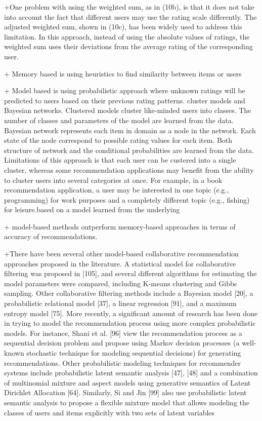 +One problem with using the weighted
sum, as in (10b), is that it does not take into account the fact
that different users may use the rating scale differently. The
adjusted weighted sum, shown in (10c), has been widely
used to address this limitation. In this approach, instead of
using the absolute values of ratings, the weighted sum uses
their deviations from the average rating of the corresponding
user.

+ Memory based is using heuristics to find similarity between items or users

+ Model based is using probabilistic approach where unknown ratings will be predicted to users based on their previous rating patterns. cluster models and Bayesian networks. 
Clustered models cluster like-minded users into classes. The number of classes and parameters of the model are learned from the data.
Bayesian network represents each item in domain as a node in the network. Each state of the node correspond to possible rating values for each item. Both structure of network and the conditional probabilities are learned from the data. Limitations of this approach is that each user can be custered into a single cluster, whereas some recommendation applications may benefit from the ability to cluster users into several categories at once. For example,
in a book recommendation application, a user may be
interested in one topic (e.g., programming) for work
purposes and a completely different topic (e.g., fishing)
for leisure.based on a model
learned from the underlying

+ model-based methods outperform memory-based
approaches in terms of accuracy of recommendations.


+There have been several other model-based collaborative
recommendation approaches proposed in the literature. A
statistical model for collaborative filtering was proposed in
[105], and several different algorithms for estimating the
model parameters were compared, including K-means
clustering and Gibbs sampling. Other collaborative filtering
methods include a Bayesian model [20], a probabilistic
relational model [37], a linear regression [91], and a
maximum entropy model [75]. More recently, a significant
amount of research has been done in trying to model the
recommendation process using more complex probabilistic
models. For instance, Shani et al. [96] view the recommendation
process as a sequential decision problem and
propose using Markov decision processes (a well-known
stochastic technique for modeling sequential decisions) for
generating recommendations. Other probabilistic modeling
techniques for recommender systems include probabilistic
latent semantic analysis [47], [48] and a combination of
multinomial mixture and aspect models using generative
semantics of Latent Dirichlet Allocation [64]. Similarly, Si
and Jin [99] also use probabilistic latent semantic analysis to
propose a flexible mixture model that allows modeling the
classes of users and items explicitly with two sets of latent
variables


